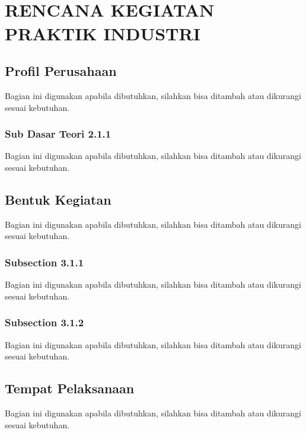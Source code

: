 
\chapter[RENCANA KEGIATAN PRAKTIK INDUSTRI]{\\ RENCANA KEGIATAN PRAKTIK INDUSTRI}

\section{Profil Perusahaan \perusahaan}
Bagian ini digunakan apabila dibutuhkan, silahkan bisa ditambah atau dikurangi sesuai kebutuhan.

\subsection{Sub Dasar Teori 2.1.1}
Bagian ini digunakan apabila dibutuhkan, silahkan bisa ditambah atau dikurangi sesuai kebutuhan.

\section{Bentuk Kegiatan}
Bagian ini digunakan apabila dibutuhkan, silahkan bisa ditambah atau dikurangi sesuai kebutuhan.

\subsection{Subsection 3.1.1}
Bagian ini digunakan apabila dibutuhkan, silahkan bisa ditambah atau dikurangi sesuai kebutuhan.

\subsection{Subsection 3.1.2}
Bagian ini digunakan apabila dibutuhkan, silahkan bisa ditambah atau dikurangi sesuai kebutuhan.

\section{Tempat Pelaksanaan}
Bagian ini digunakan apabila dibutuhkan, silahkan bisa ditambah atau dikurangi sesuai kebutuhan.

